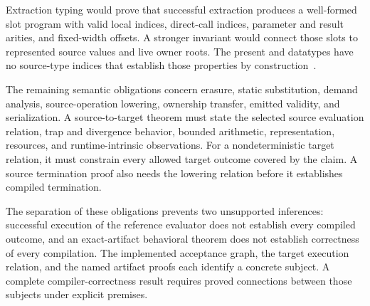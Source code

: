 \documentclass[11pt]{article}
\newcommand{\code}[1]{\texttt{\seqsplit{#1}}}
\begin{document}
Extraction typing would prove that successful extraction produces a well-formed slot program with valid local indices, direct-call indices, parameter and result arities, and fixed-width offsets.  A stronger invariant would connect those slots to represented source values and live owner roots.  The present \code{IR.Expr} and \code{IR.Stmt} datatypes have no source-type indices that establish those properties by construction~\cite{ir}.

The remaining semantic obligations concern erasure, static substitution, demand analysis, source-operation lowering, ownership transfer, emitted validity, and serialization.  A source-to-target theorem must state the selected source evaluation relation, trap and divergence behavior, bounded arithmetic, representation, resources, and runtime-intrinsic observations.  For a nondeterministic target relation, it must constrain every allowed target outcome covered by the claim.  A source termination proof also needs the lowering relation before it establishes compiled termination.

The separation of these obligations prevents two unsupported inferences: successful execution of the reference evaluator does not establish every compiled outcome, and an exact-artifact behavioral theorem does not establish correctness of every compilation.  The implemented acceptance graph, the target execution relation, and the named artifact proofs each identify a concrete subject.  A complete compiler-correctness result requires proved connections between those subjects under explicit premises.
\end{document}

